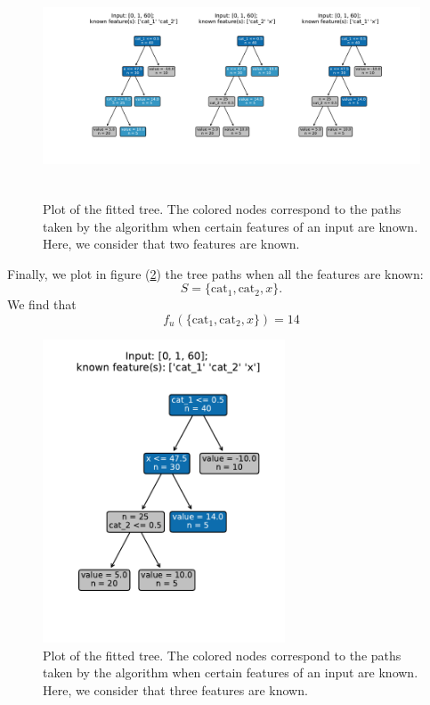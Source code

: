 \documentclass[11pt]{article}
\begin{document}
\begin{figure}[H]
    \centering
    \includegraphics[height=6.6cm]{"../outputs/plot_tree/figures/path_2_known.pdf"}
    \caption{Plot of the fitted tree. The colored nodes correspond to the paths taken 
    by the algorithm when certain features of an input are known. Here, we consider that 
    two features are known.}
    \label{fig:tree2}
\end{figure}


Finally, we plot in figure (\ref{fig:tree3}) the tree paths when all the features are known: 
$$S = \{\text{cat}_1, \text{cat}_2, x\}.$$
We find that 
$$f_u(\{\text{cat}_1, \text{cat}_2, x\}) = 14$$

\begin{figure}[H]
    \centering
    \includegraphics[height=9cm]{"../outputs/plot_tree/figures/path_3_known.pdf"}
    \caption{Plot of the fitted tree. The colored nodes correspond to the paths taken 
    by the algorithm when certain features of an input are known. Here, we consider that 
    three features are known.}
    \label{fig:tree3}
\end{figure}
\end{document}

